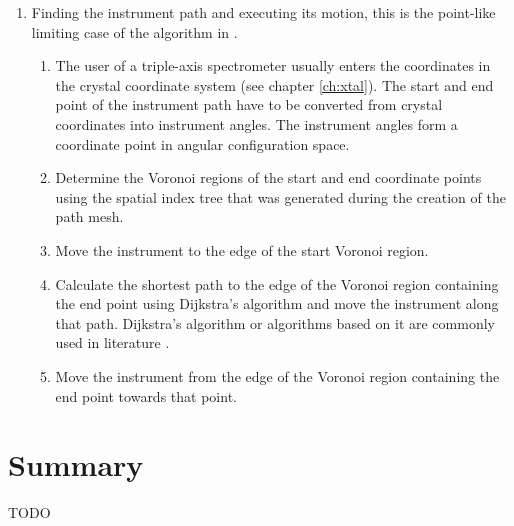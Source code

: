 \begin{enumerate}
	\item Finding the instrument path and executing its motion, this is the point-like limiting case of the algorithm in \cite[p. 163]{Berg2008}.
	\begin{enumerate}
		\item The user of a triple-axis spectrometer usually enters the coordinates 
			in the crystal coordinate system (see chapter \ref{ch:xtal}). The start 
			and end point of the instrument path have to be converted from crystal
			coordinates into instrument angles. The instrument angles form a 
			coordinate point in angular configuration space.
		\item Determine the Voronoi regions of the start and end coordinate points
			using the spatial index tree that was generated during the creation
			of the path mesh.
		\item Move the instrument to the edge of the start Voronoi region.
		\item Calculate the shortest path to the edge of the Voronoi region 
			containing the end point using Dijkstra's algorithm \cite{wiki_dijkstra}
			and move the instrument along that path.
			Dijkstra's algorithm or algorithms based on it are commonly used
			in literature \cite{Hwang2003, Singal2014}.
		\item Move the instrument from the edge of the Voronoi region containing 
			the end point towards that point.
	\end{enumerate}
\end{enumerate}


\section{Summary}

TODO
